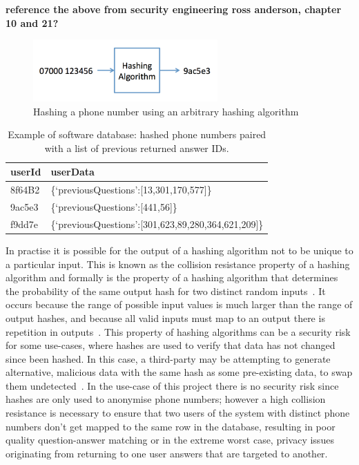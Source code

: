 \documentclass[authoryearcitations]{UoYCSproject}
\begin{document}
{\bf reference the above from security engineering ross anderson, chapter 10 and 21?}

\begin{figure}[htb]
    \centering
    \includegraphics[width=200pt]{hashPhoneNumber}
    \caption{Hashing a phone number using an arbitrary hashing algorithm}
    \label{fig:hashPhoneNumber}
\end{figure}

\begin{table}
\begin{center}
    \begin{tabular}{| l | l |}
    \hline
    userId & userData \\ \hline
    8f64B2 & \{‘previousQuestions’:[13,301,170,577]\} \\ \hline
    9ac5e3 & \{‘previousQuestions’:[441,56]\} \\ \hline
    f9dd7e & \{‘previousQuestions’:[301,623,89,280,364,621,209]\} \\
    \hline
    \end{tabular}
    \caption{Example of software database: hashed phone numbers paired with a list of previous returned answer IDs. }
    \label{table:hashDatabase}
\end{center}
\end{table}

In practise it is possible for the output of a hashing algorithm not to be unique to a particular input.  This is known as the collision resistance property of a hashing algorithm and formally is the property of a hashing algorithm that determines the probability of the same output hash for two distinct random inputs~\cite{mitCryptographyMd5}.  It occurs because the range of possible input values is much larger than the range of output hashes, and because all valid inputs must map to an output there is repetition in outputs~\cite{mitCryptographyMd5}.  This property of hashing algorithms can be a security risk for some use-cases, where hashes are used to verify that data has not changed since been hashed.  In this case, a third-party may be attempting to generate alternative, malicious data with the same hash as some pre-existing data, to swap them undetected~\cite{securityEngineeringHashingAnderson}.  In the use-case of this project there is no security risk since hashes are only used to anonymise phone numbers; however a high collision resistance is necessary to ensure that two users of the system with distinct phone numbers don't get mapped to the same row in the database, resulting in poor quality question-answer matching or in the extreme worst case, privacy issues originating from returning to one user answers that are targeted to another.
\end{document}

